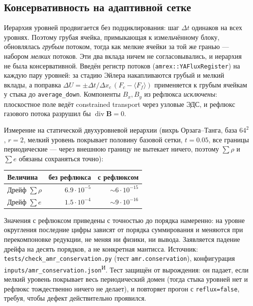 \documentclass[12pt,a4paper]{article}
\newcommand{\divg}{\operatorname{div}}
\newcommand{\B}{\mathbf{B}}
\newcommand{\code}[1]{\texttt{#1}}
\newcommand{\Iz}{\textsuperscript{\scriptsize И}}    %
\begin{document}
\subsection{Консервативность на адаптивной сетке}
\label{sec:res-amr}

Иерархия уровней продвигается без подциклирования: шаг $\Delta t$ одинаков на
всех уровнях. Поэтому грубая ячейка, примыкающая к измельчённому блоку,
обновлялась \emph{грубым} потоком, тогда как мелкие ячейки за той же гранью ---
набором \emph{мелких} потоков. Эти два вклада ничем не согласовывались, и
иерархия не была консервативной. Введён регистр потоков
(\code{amrex::YAFluxRegister}) на каждую пару уровней: за стадию Эйлера
накапливаются грубый и мелкий вклады, а поправка
$\Delta U=\pm\Delta t/\Delta x_c\,(F_c-\langle F_f\rangle)$ применяется к грубым
ячейкам у стыка до \code{average\_down}. Компоненты $B_x, B_y$ из рефлюкса
\emph{исключены}: плоскостное поле ведёт constrained transport через узловые
ЭДС, и рефлюкс газового потока разрушил бы $\divg\B=0$.

Измерение на статической двухуровневой иерархии (вихрь Орзага--Танга, база
$64^2$, $r=2$, мелкий уровень покрывает половину базовой сетки, $t=0.05$, все
границы периодические --- через внешнюю границу не вытекает ничего, поэтому
$\sum\rho$ и $\sum e$ обязаны сохраняться точно):

\begin{center}
\begin{tabular}{lrr}
\toprule
Величина & без рефлюкса & с рефлюксом \\
\midrule
Дрейф $\sum\rho$   & $6.9\!\cdot\!10^{-5}$ & ${\sim}6\!\cdot\!10^{-15}$ \\
Дрейф $\sum e$     & $1.5\!\cdot\!10^{-4}$ & ${\sim}9\!\cdot\!10^{-16}$ \\
\bottomrule
\end{tabular}
\end{center}
\noindent\footnotesize
Значения с рефлюксом приведены с точностью до порядка намеренно: на уровне
округления последние цифры зависят от порядка суммирования и меняются при
перекомпоновке редукции, не меняя ни физики, ни вывода. Заявляется падение
дрейфа на десять порядков, а не конкретная мантисса.
Источник: \code{tests/check\_amr\_conservation.py} (тест \code{amr.conservation}),
конфигурация \code{inputs/amr\_conservation.json}\Iz. Тест защищён от вырождения:
он падает, если мелкий уровень покрывает весь периодический домен (тогда стыка
уровней нет и рефлюкс тождественно ничего не делает), и повторяет прогон с
\code{reflux=false}, требуя, чтобы дефект действительно проявился.\normalsize
\end{document}
